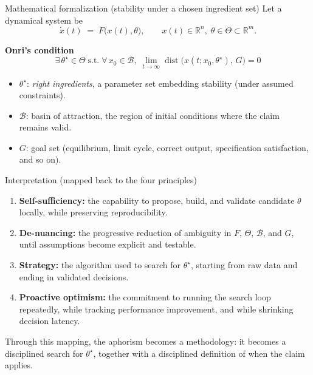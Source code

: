 \documentclass[presentation,aspectratio=169,11pt]{beamer}
\newcommand{\KeyTerm}[1]{\textbf{#1}}
\begin{document}
\begin{frame}{Mathematical formalization (stability under a chosen ingredient set)}
\justifying
\small
Let a dynamical system be
\[
    \dot{x}(t) \;=\; F\!\bigl(x(t),\theta\bigr),
    \qquad x(t)\in\mathbb{R}^n,\; \theta\in\Theta\subset\mathbb{R}^m.
\]

\vspace{0.75em}
\textbf{Onri's condition}
\[
  \boxed{\;
    \exists\,\theta^{\star}\in\Theta\;
    \text{s.t.}\;
    \forall\,x_0\in\mathcal{B},\;
    \lim_{t\to\infty} \operatorname{dist}\!\bigl(x(t;x_0,\theta^{\star}),\, G\bigr) = 0
  \;}
\]

\vspace{0.75em}
\begin{itemize}
  \setlength\itemsep{0.45em}
  \item $\theta^{\star}$: \emph{right ingredients}, a parameter set embedding stability (under assumed constraints).
  \item $\mathcal{B}$: basin of attraction, the region of initial conditions where the claim remains valid.
  \item $G$: goal set (equilibrium, limit cycle, correct output, specification satisfaction, and so on).
\end{itemize}
\end{frame}

\begin{frame}{Interpretation (mapped back to the four principles)}
\justifying
\begin{enumerate}
  \item \KeyTerm{Self-sufficiency:} the capability to propose, build, and validate candidate $\theta$ locally, while preserving reproducibility.
  \item \KeyTerm{De-nuancing:} the progressive reduction of ambiguity in $F$, $\Theta$, $\mathcal{B}$, and $G$, until assumptions become explicit and testable.
  \item \KeyTerm{Strategy:} the algorithm used to search for $\theta^{\star}$, starting from raw data and ending in validated decisions.
  \item \KeyTerm{Proactive optimism:} the commitment to running the search loop repeatedly, while tracking performance improvement, and while shrinking decision latency.
\end{enumerate}

\vspace{0.5em}
\small
Through this mapping, the aphorism becomes a methodology: it becomes a disciplined search for $\theta^{\star}$, together with a disciplined definition of when the claim applies.
\end{frame}
\end{document}
